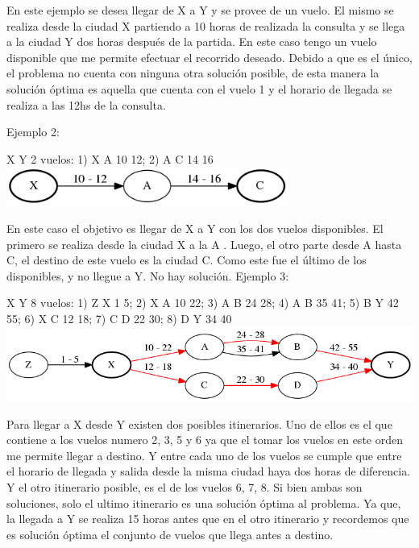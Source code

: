 \documentclass[a4paper]{article}
\begin{document}
En este ejemplo se desea llegar de X a Y y se provee de un vuelo. El mismo se realiza desde la ciudad X partiendo a 10 horas de realizada la consulta y se llega a la ciudad Y dos horas después de la partida. En este caso tengo un vuelo disponible que me permite efectuar el recorrido deseado. Debido  a que es el único, el problema no cuenta con ninguna otra solución posible, de esta manera la solución óptima es aquella que cuenta con el vuelo 1 y el horario de llegada se realiza a las 12hs de la consulta.\newline \newline


Ejemplo 2:

X Y 2\newline
vuelos:
1) X A 10 12;  2) A C  14 16\newline
\includegraphics[width=\textwidth,height=0.5in,keepaspectratio
]{ejemplo2.png}\newline

En este caso el objetivo es llegar de X a Y con los dos vuelos disponibles. El primero  se realiza desde la ciudad X a la A . Luego, el otro parte desde A hasta C, el destino de este vuelo es la ciudad C. Como este fue el último de los disponibles, y  no llegue a Y. No hay solución.\newline \newline
\newpage
Ejemplo 3:

X Y 8\newline
vuelos:
1) Z X 1 5;  2) X A 10 22;  3) A B  24 28;  4) A B 35 41;   5) B Y 42 55;  6) X C 12 18;
7) C D 22 30;  8) D Y 34 40\newline
\includegraphics[width=\textwidth,height=\textheight,keepaspectratio
]{ejemplo3.png}\newline


Para llegar a X desde Y existen dos posibles itinerarios. Uno de ellos es el que contiene a los vuelos numero 2, 3, 5 y 6 ya que el tomar los vuelos en este orden me permite llegar a destino. Y entre cada uno de los vuelos se cumple que entre el horario de llegada y salida desde la misma ciudad  
haya dos horas de diferencia. Y el otro itinerario posible, es el de los vuelos 6, 7, 8. Si bien ambas son soluciones, solo el ultimo itinerario es una solución óptima al problema. Ya que, la llegada a Y se realiza 15 horas antes que en el otro itinerario y recordemos que es solución óptima el conjunto de vuelos que llega antes a destino.\newline  \newline
\end{document}
